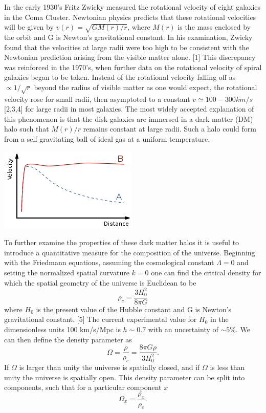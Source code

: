 \documentclass[a4paper,12pt]{article}
\begin{document}
In the early 1930's Fritz Zwicky measured the rotational velocity of eight galaxies in the Coma Cluster.  Newtonian physics predicts that these rotational velocities will be given by $v(r)=\sqrt{GM(r)/r}$, where $M(r)$ is the mass enclosed by the orbit and G is Newton's gravitational constant.  In his examination, Zwicky found that the velocities at large radii were too high to be consistent with the Newtonian prediction arising from the visible matter alone. [1] This discrepancy was reinforced in the 1970's, when further data on the rotational velocity of spiral galaxies began to be taken.  Instead of the rotational velocity falling off as $\propto 1/\sqrt{r}$ beyond the radius of visible matter as one would expect, the rotational velocity rose for small radii, then asymptoted to a constant $ v \simeq 100-300 km/s $ [2,3,4] for large radii in most galaxies.  The most widely accepted explanation of this phenomenon is that the disk galaxies are immersed in a dark matter (DM) halo such that $ M(r)/r $ remains constant at large radii.  Such a halo could form from a self gravitating ball of ideal gas at a uniform temperature.

\begin{center}
\includegraphics[scale=1]{RotationCurve.png}
\end{center}

To further examine the properties of these dark matter halos it is useful to introduce a quantitative measure for the composition of the universe.  Beginning with the Friedmann equations, assuming the cosmological constant $\Lambda = 0$ and setting the normalized spatial curvature $k = 0$ one can find the critical density for which the spatial geometry of the universe is Euclidean to be
\[\rho_c =\frac{3H_0^2}{8 \pi G} \]
where $H_0$ is the present value of the Hubble constant and G is Newton's gravitational constant. [5] The current experimental value for $H_0$ in the dimensionless units 100 km/s/Mpc is $ h \sim 0.7 $ with an uncertainty of $\sim5\%$.  We can then define the density parameter as 
\[\Omega=\frac{\rho}{\rho_c}=\frac{8 \pi G \rho}{3 H_0^2}.\]
If $\Omega$ is larger than unity the universe is spatially closed, and if $\Omega$ is less than unity the universe is spatially open. This density parameter can be split into components, such that for a particular component $x$
\[\Omega_x = \frac{\rho_x}{\rho_c}.\]
\end{document}
